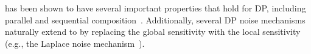 \propi has been shown to have several important properties that hold for DP, including parallel and sequential composition~\citep{ref_88}.
Additionally, several DP noise mechanisms naturally extend to \propi by replacing the global sensitivity with the local sensitivity (e.g., the Laplace noise mechanism~\citep{ref_88}). 










